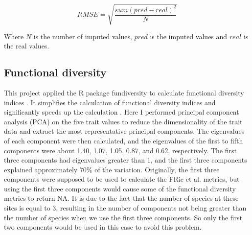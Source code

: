 \documentclass[a4paper, 11, margin=2cm]{article}
\begin{document}
      \begin{equation} RMSE = \sqrt{\frac{sum(pred - real)^2}{N}}  \end{equation}

    Where $N$ is the number of imputed values, $pred$ is the imputed values and $real$ is the real values.

    \subsection{Functional diversity}

    This project applied the R package fundiversity to calculate functional diversity indices \citep{fundiversity}. It simplifies the calculation of functional diversity indices and significantly speeds up the calculation \citep{grenie2023fundiversity}. Here I performed principal component analysis (PCA) on the five trait values to reduce the dimensionality of the trait data and extract the most representative principal components. The eigenvalues of each component were then calculated, and the eigenvalues of the first to fifth components were about 1.40, 1.07, 1.05, 0.87, and 0.62, respectively. The first three components had eigenvalues greater than 1, and the first three components explained approximately 70\% of the variation. Originally, the first three components were supposed to be used to calculate the FRic et al. metrics, but using the first three components would cause some of the functional diversity metrics to return NA. It is due to the fact that the number of species at these sites is equal to 3, resulting in the number of components not being greater than the number of species when we use the first three components. So only the first two components would be used in this case to avoid this problem.
\end{document}
